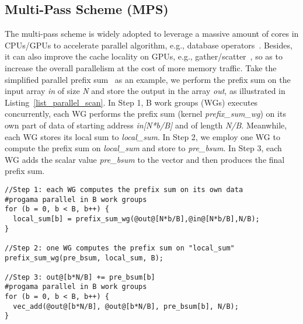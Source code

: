 \subsection{Multi-Pass Scheme (MPS)}
The multi-pass scheme is widely adopted to leverage a massive amount of cores in CPUs/GPUs to accelerate parallel algorithm, e.g., database operators~\cite{query_gpu_tods09, omnidb_vldb13, query_openCL_fpga_fpl16}. Besides, it can also improve the cache locality on GPUs, e.g., gather/scatter~\cite{gather_scatter_sc07}, so as to increase the overall parallelism at the cost of more memory traffic. Take the simplified parallel prefix sum~\cite{scan_gpu_nvidia07} as an example, we perform the prefix sum on the input array \emph{in} of size \emph{N} and store the output in the array \emph{out}, as illustrated in Listing~\ref{list_parallel_scan}. In Step 1, B work groups (WGs) executes concurrently, each WG performs the prefix sum (kernel \emph{prefix\_sum\_wg}) on its own part of data of starting address \emph{in[N*b/B]} and of length \emph{N/B}. Meanwhile, each WG stores its local sum to \emph{local\_sum}. In Step 2, we employ one WG to compute the prefix sum on \emph{local\_sum} and store to \emph{pre\_bsum}. In Step 3, each WG adds the scalar value \emph{pre\_bsum} to the vector and then produces the final prefix sum. 

\begin{lstlisting}[caption={MPS-based prefix sum},label={list_parallel_scan},captionpos=b]
//Step 1: each WG computes the prefix sum on its own data
#progama parallel in B work groups
for (b = 0, b < B, b++) { 
  local_sum[b] = prefix_sum_wg(@out@[N*b/B],@in@[N*b/B],N/B);
}

//Step 2: one WG computes the prefix sum on "local_sum"
prefix_sum_wg(pre_bsum, local_sum, B);

//Step 3: out@[b*N/B] += pre_bsum[b]
#progama parallel in B work groups
for (b = 0, b < B, b++) {
  vec_add(@out@[b*N/B], @out@[b*N/B], pre_bsum[b], N/B);
}
\end{lstlisting}

